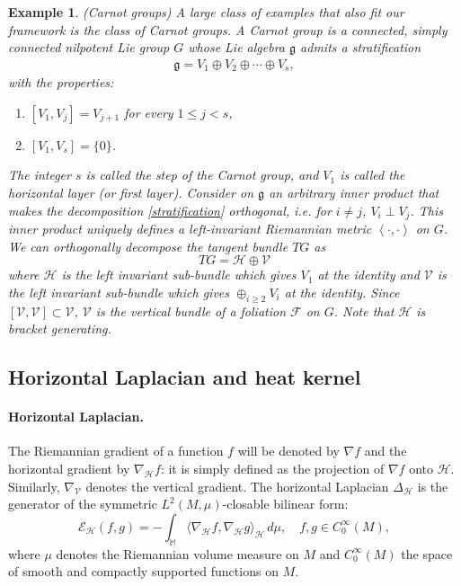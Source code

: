 \documentclass[11pt]{article}
\numberwithin{equation}{section}
\newtheorem{example}[theorem]{Example}
\newcommand{\bM}{\mathbb M}
\newcommand{\Ho}{\mathcal H}
\newcommand{\V}{\mathcal V}
\begin{document}
\begin{example}\label{Carnot example}(Carnot groups)
A large class of examples that also fit our framework is the class of Carnot groups. A Carnot group is a connected, simply connected nilpotent Lie group $G$ whose Lie algebra  $\mathfrak{g}$ admits a stratification
	\begin{align}\label{stratification}
		\mathfrak{g} = V_{1} \oplus V_{2} \oplus \cdots \oplus V_{s},
	\end{align}
	with the properties:
	\begin{enumerate}
		\item $[V_{1}, V_{j}] = V_{j+1}$ for every $1 \leq j < s$,
		\item $[V_{1}, V_{s}] = \{0\}$.
	\end{enumerate}
	The integer $s$ is called the step of the Carnot group, and $V_{1}$ is called the horizontal layer (or first layer). Consider on $\mathfrak{g}$ an arbitrary inner product that makes the decomposition \eqref{stratification} orthogonal, i.e. for $i \neq j$, $V_i \perp V_j$. This inner product uniquely defines a left-invariant Riemannian metric $\left\langle \cdot,\cdot \right\rangle$ on $G$. We can orthogonally decompose the tangent bundle $TG$ as
	\[
	TG=\mathcal{H}\oplus \mathcal{V}
	\]
	where $\Ho$ is the left invariant sub-bundle which gives $V_1$ at the identity and $\V$ is the left invariant sub-bundle which gives $\oplus_{i \ge 2} V_i$ at the identity. Since $[\mathcal{V},\mathcal{V}] \subset \mathcal{V}$, $\V$ is the vertical bundle of a foliation $\mathcal{F}$ on $G$. Note that $\Ho$ is bracket generating.
    \end{example}
	
    
	
	\subsection{Horizontal Laplacian and heat kernel}
	
	\paragraph{Horizontal Laplacian.}The Riemannian gradient of a function $f$ will be denoted by $\nabla f$ and the horizontal gradient by $\nabla_\Ho f$: it is simply defined as the projection of $\nabla f$ onto $\mathcal{H}$. Similarly, $\nabla_\V$ denotes the vertical gradient. The horizontal Laplacian $\Delta_\Ho$ is the generator of the symmetric $L^2(M,\mu)$-closable bilinear form:
	\[
	\mathcal{E}_{\mathcal{H}} (f,g) 
	=-\int_\bM \langle \nabla_\mathcal{H} f , \nabla_\mathcal{H} g \rangle_{\mathcal{H}} \,d\mu, 
	\quad f,g \in C_0^\infty(M),
	\]
	where $\mu$ denotes the Riemannian volume measure on $M$ and  $C_0^\infty(M)$ the space of smooth and compactly supported functions on $M$.
	
\end{document}

